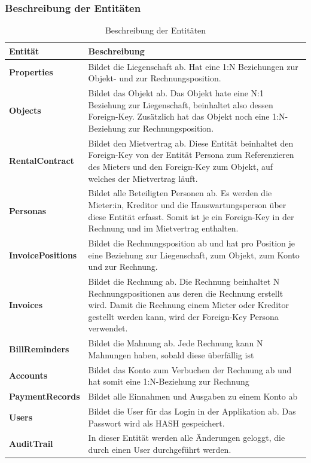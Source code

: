 \subsubsection{Beschreibung der Entitäten}
\begin{table}[H]
  \centering
  \settowidth{}
  \setlength\extrarowheight{2pt}
    \begin{tabulary}{1.0\textwidth}{|L|m{15cm}|}
      \hline
      \textbf{Entität}& \textbf{Beschreibung}\\
    \hline
    \textbf{Properties} & Bildet die Liegenschaft ab. Hat eine 1:N Beziehungen zur Objekt- und zur Rechnungsposition.\\
    \hline
    \textbf{Objects} & Bildet das Objekt ab. Das Objekt hate eine N:1 Beziehung zur Liegenschaft, beinhaltet also dessen Foreign-Key. Zusätzlich hat das Objekt noch eine 1:N-Beziehung zur Rechnungsposition.\\
    \hline
    \textbf{RentalContract} & Bildet den Mietvertrag ab. Diese Entität beinhaltet den Foreign-Key von der Entität Persona zum Referenzieren des Mieters und den Foreign-Key zum Objekt, auf welches der Mietvertrag läuft. \\
    \hline
    \textbf{Personas} & Bildet alle Beteiligten Personen ab. Es werden die Mieter:in, Kreditor und die Hauswartungsperson über diese Entität erfasst. Somit ist je ein Foreign-Key in der Rechnung und im Mietvertrag enthalten. \\
    \hline
    \textbf{InvoicePositions} & Bildet die Rechnungsposition ab und hat pro Position je eine Beziehung zur Liegenschaft, zum Objekt, zum Konto und zur Rechnung.\\
    \hline
    \textbf{Invoices} & Bildet die Rechnung ab. Die Rechnung beinhaltet N Rechnungspositionen aus deren die Rechnung erstellt wird. Damit die Rechnung einem Mieter oder Kreditor gestellt werden kann, wird der Foreign-Key Persona verwendet.\\
    \hline
    \textbf{BillReminders} & Bildet die Mahnung ab. Jede Rechnung kann N Mahnungen haben, sobald diese überfällig ist \\
    \hline
    \textbf{Accounts} & Bildet das Konto zum Verbuchen der Rechnung ab und hat somit eine 1:N-Beziehung zur Rechnung\\
    \hline
    \textbf{PaymentRecords} & Bildet alle Einnahmen und Ausgaben zu einem Konto ab\\
    \hline
    \textbf{Users} & Bildet die User für das Login in der Applikation ab. Das Passwort wird als HASH gespeichert.\\
    \hline 
    \textbf{AuditTrail} & In dieser Entität werden alle Änderungen geloggt, die durch einen User durchgeführt werden.\\
    \hline 
\end{tabulary}
\caption{Beschreibung der Entitäten}
\end{table}

